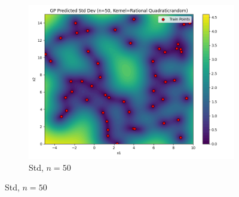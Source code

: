 \documentclass[a4paper,12pt]{article}
\begin{document}
\begin{figure}[H]
\begin{subfigure}{0.3\textwidth}
    \includegraphics[width=\linewidth]{Task-02/images/gp_std_rational_quadratic_n50_random.png}
    \caption{Std, $n=50$}
\end{subfigure}


\end{figure}
\end{document}
